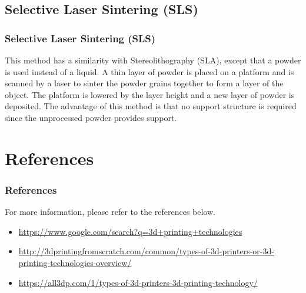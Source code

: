 \documentclass[english,10pt]{beamer}
\begin{document}
\subsection{Selective Laser Sintering (SLS)}
\begin{frame}
  \frametitle{Selective Laser Sintering (SLS)}
  This method has a similarity with Stereolithography (SLA), except that a powder is used instead of a liquid.  A thin layer of powder is placed on a platform and is scanned by a laser to sinter the powder grains together to form a layer of the object.  The platform is lowered by the layer height and a new layer of powder is deposited.  The advantage of this method is that no support structure is required since the unprocessed powder provides support.
\end{frame}

\section{References}
\begin{frame}
  \frametitle{References}
  For more information, please refer to the references below.
  \begin{itemize}
    \item \url{https://www.google.com/search?q=3d+printing+technologies}
    \item \url{http://3dprintingfromscratch.com/common/types-of-3d-printers-or-3d-printing-technologies-overview/}
    \item \url{https://all3dp.com/1/types-of-3d-printers-3d-printing-technology/}
  \end{itemize}
\end{frame}
\end{document}
